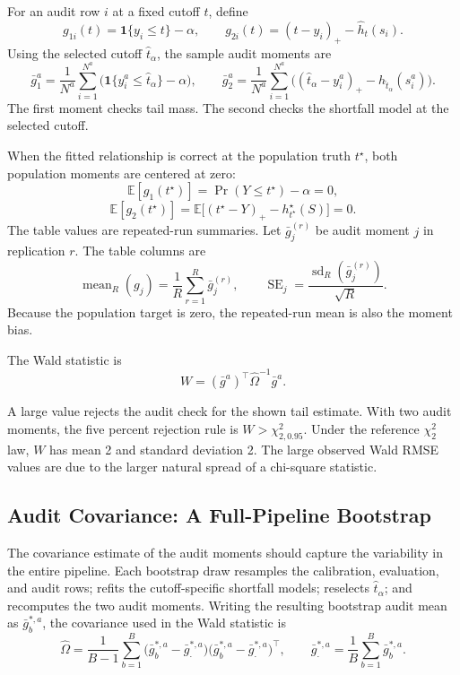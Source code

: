 \documentclass[11pt]{article}
\newcommand{\ind}{\mathbf{1}}
\begin{document}
For an audit row \(i\) at a fixed cutoff \(t\), define
\[
  g_{1i}(t)
  =
  \ind\{y_i \le t\}-\alpha,
  \qquad
  g_{2i}(t)
  =
  (t-y_i)_+-\hat h_t(s_i).
\]
Using the selected cutoff \(\hat t_\alpha\), the sample audit moments are
\[
  \bar g_1^a
  =
  \frac{1}{N^a}
  \sum_{i=1}^{N^a}
  \bigl(\ind\{y_i^a \le \hat t_\alpha\}-\alpha\bigr),
  \qquad
  \bar g_2^a
  =
  \frac{1}{N^a}
  \sum_{i=1}^{N^a}
  \bigl((\hat t_\alpha-y_i^a)_+-\hat h_{\hat t_\alpha}(s_i^a)\bigr).
\]
The first moment checks tail mass.  The second checks the shortfall model at
the selected cutoff.

When the fitted relationship is correct at the population truth \(t^\star\),
both population moments are centered at zero:
\[
  \mathbb{E}[g_1(t^\star)]
  =
  \Pr(Y\le t^\star)-\alpha
  =
  0,
\]
\[
  \mathbb{E}[g_2(t^\star)]
  =
  \mathbb{E}\bigl[(t^\star-Y)_+ - h^\star_{t^\star}(S)\bigr]
  =
  0.
\]
The table values are repeated-run summaries.  Let \(\bar g_j^{(r)}\) be audit
moment \(j\) in replication \(r\).  The table columns are
\[
  \operatorname{mean}_R(g_j)
  =
  \frac{1}{R}\sum_{r=1}^{R}\bar g_j^{(r)},
  \qquad
  \operatorname{SE}_j
  =
  \frac{\operatorname{sd}_R(\bar g_j^{(r)})}{\sqrt R}.
\]
Because the population target is zero, the repeated-run mean is also the
moment bias.

The Wald statistic is
\[
  W
  =
  (\bar g^a)^\top \hat\Omega^{-1}\bar g^a.
\]

A large value rejects the audit check for the shown tail estimate.  With two
audit moments, the five percent rejection rule is \(W>\chi^2_{2,0.95}\).  Under
the reference \(\chi^2_2\) law, \(W\) has mean 2 and standard deviation 2.  The
large observed Wald RMSE values are due to the larger natural spread of
a chi-square statistic.

\subsection{Audit Covariance: A Full-Pipeline Bootstrap}

The covariance estimate of the audit moments should capture the variability in the entire pipeline.  Each bootstrap draw resamples the
calibration, evaluation, and audit rows; refits the cutoff-specific shortfall
models; reselects \(\hat t_\alpha\); and recomputes the two audit moments.
Writing the resulting bootstrap audit mean as \(\bar g_b^{*,a}\), the covariance
used in the Wald statistic is
\[
  \hat\Omega
  =
  \frac{1}{B-1}\sum_{b=1}^{B}
  \bigl(\bar g_b^{*,a}-\bar g_{\cdot}^{*,a}\bigr)
  \bigl(\bar g_b^{*,a}-\bar g_{\cdot}^{*,a}\bigr)^\top,
  \qquad
  \bar g_{\cdot}^{*,a}
  =
  \frac{1}{B}\sum_{b=1}^{B}\bar g_b^{*,a}.
\]
\end{document}
